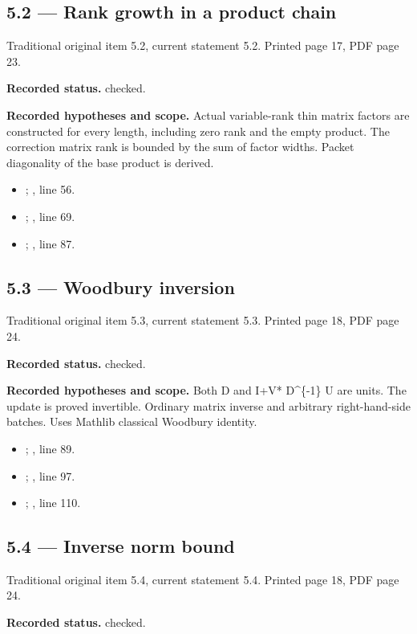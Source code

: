 \subsection{5.2 — Rank growth in a product chain}
\label{result:5.2}
{\footnotesize\color{muted}Traditional original item 5.2, current statement 5.2. Printed page 17, PDF page 23.}\par
\textbf{Recorded status.} checked.

\textbf{Recorded hypotheses and scope.} Actual variable-rank thin matrix factors are constructed for every length, including zero rank and the empty product. The correction matrix rank is bounded by the sum of factor widths. Packet diagonality of the base product is derived.

\begin{itemize}
\item {}; , line 56.
\item {}; , line 69.
\item {}; , line 87.
\end{itemize}
\subsection{5.3 — Woodbury inversion}
\label{result:5.3}
{\footnotesize\color{muted}Traditional original item 5.3, current statement 5.3. Printed page 18, PDF page 24.}\par
\textbf{Recorded status.} checked.

\textbf{Recorded hypotheses and scope.} Both D and I+V* D\textasciicircum{}\{-1\} U are units. The update is proved invertible. Ordinary matrix inverse and arbitrary right-hand-side batches. Uses Mathlib classical Woodbury identity.

\begin{itemize}
\item {}; , line 89.
\item {}; , line 97.
\item {}; , line 110.
\end{itemize}
\subsection{5.4 — Inverse norm bound}
\label{result:5.4}
{\footnotesize\color{muted}Traditional original item 5.4, current statement 5.4. Printed page 18, PDF page 24.}\par
\textbf{Recorded status.} checked.


